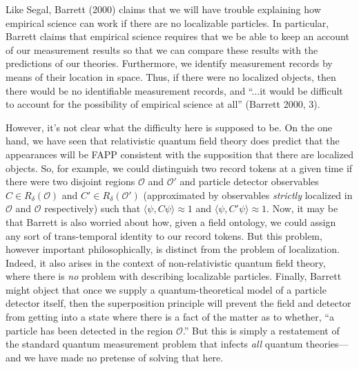 \documentclass[11pt]{article}
\theoremstyle{remark}
\begin{document}
Like Segal, Barrett (2000) claims that we will have trouble explaining
how empirical science can work if there are no localizable particles.
In particular, Barrett claims that empirical science requires that we
be able to keep an account of our measurement results so that we can
compare these results with the predictions of our theories.
Furthermore, we identify measurement records by means of their
location in space.  Thus, if there were no localized objects, then
there would be no identifiable measurement records, and ``...it would
be difficult to account for the possibility of empirical science at
all'' (Barrett 2000, 3).

However, it's not clear what the difficulty here is supposed to be.
On the one hand, we have seen that relativistic quantum field theory
does predict that the appearances will be FAPP consistent with the
supposition that there are localized objects.  So, for example, we
could distinguish two record tokens at a given time if there were two
disjoint regions $\mathcal{O}$ and $\mathcal{O}'$ and particle
detector observables $C\in R_{\delta}(\mathcal{O})$ and $C'\in
R_{\delta}(\mathcal{O}')$ (approximated by observables \emph{strictly}
localized in $\mathcal{O}$ and $\mathcal{O}$ respectively) such that
$\langle \psi ,C\psi \rangle \approx 1$ and $\langle \psi ,C'\psi
\rangle \approx 1$.  Now, it may be that Barrett is also worried about
how, given a field ontology, we could assign any sort of
trans-temporal identity to our record tokens.  But this problem,
however important philosophically, is distinct from the problem of
localization.  Indeed, it also arises in the context of
non-relativistic quantum field theory, where there is \emph{no}
problem with describing localizable particles.  Finally, Barrett might
object that once we supply a quantum-theoretical model of a particle
detector itself, then the superposition principle will prevent the
field and detector from getting into a state where there is a fact of
the matter as to whether, ``a particle has been detected in the region
$\mathcal{O}$.''  But this is simply a restatement of the standard
quantum measurement problem that infects \emph{all} quantum
theories---and we have made no pretense of solving that here.
\end{document}
